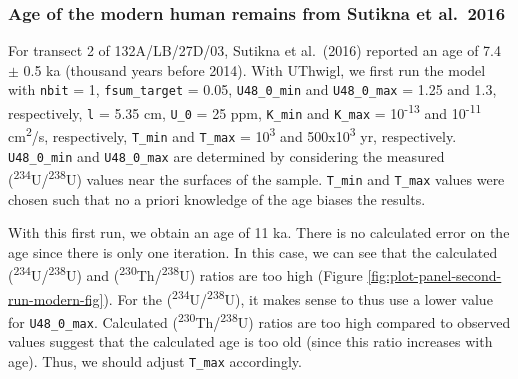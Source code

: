 \documentclass[]{elsarticle} %
\begin{document}
\hypertarget{age-of-the-modern-human-remains-from-sutikna-et-al.-2016}{%
\subsubsection{Age of the modern human remains from Sutikna et al.~2016}\label{age-of-the-modern-human-remains-from-sutikna-et-al.-2016}}

For transect 2 of 132A/LB/27D/03, Sutikna et al.~(2016) reported an age of 7.4 \(\pm\) 0.5 ka (thousand years before 2014). With UThwigl, we first run the model with \texttt{nbit} = 1, \texttt{fsum\_target} = 0.05, \texttt{U48\_0\_min} and \texttt{U48\_0\_max} = 1.25 and 1.3, respectively, \texttt{l} = 5.35 cm, \texttt{U\_0} = 25 ppm, \texttt{K\_min} and \texttt{K\_max} = 10\textsuperscript{-13} and 10\textsuperscript{-11} cm\textsuperscript{2}/s, respectively, \texttt{T\_min} and \texttt{T\_max} = 10\textsuperscript{3} and 500x10\textsuperscript{3} yr, respectively. \texttt{U48\_0\_min} and \texttt{U48\_0\_max} are determined by considering the measured (\textsuperscript{234}U/\textsuperscript{238}U) values near the surfaces of the sample. \texttt{T\_min} and \texttt{T\_max} values were chosen such that no a priori knowledge of the age biases the results.

With this first run, we obtain an age of 11 ka. There is no calculated error on the age since there is only one iteration. In this case, we can see that the calculated (\textsuperscript{234}U/\textsuperscript{238}U) and (\textsuperscript{230}Th/\textsuperscript{238}U) ratios are too high (Figure \ref{fig:plot-panel-second-run-modern-fig}). For the (\textsuperscript{234}U/\textsuperscript{238}U), it makes sense to thus use a lower value for \texttt{U48\_0\_max}. Calculated (\textsuperscript{230}Th/\textsuperscript{238}U) ratios are too high compared to observed values suggest that the calculated age is too old (since this ratio increases with age). Thus, we should adjust \texttt{T\_max} accordingly.
\end{document}

